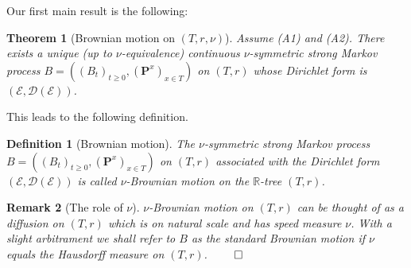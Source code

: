 \documentclass[11pt]{amsart}
\numberwithin{equation}{section}
\newtheorem{definition}{Definition}[section]
\newtheorem{theorem}{Theorem}
\newtheorem{remark}[definition]{Remark}
\begin{document}
Our first main result is the following:

\begin{theorem}[Brownian motion on $(T,r,\nu)$]
Assume (A1) and (A2). There exists a {unique (up to $\nu$-equivalence)}
continuous $\nu$-symmetric strong Markov process
$B=((B_t)_{t\ge 0},({\mathbf P}^x)_{x\in T})$ on $(T,r)$
whose Dirichlet form is
$({\mathcal E}, {\mathcal D}({\mathcal E}))$.
\label{T:01}\end{theorem}{\smallskip}

This leads to the following definition.
\begin{definition}[Brownian motion] The $\nu$-symmetric strong Markov process
$B=((B_t)_{t\ge 0},({\mathbf P}^x)_{x\in T})$ on $(T,r)$
associated with the Dirichlet form $({\mathcal E}, {\mathcal D}({\mathcal E}))$ is called $\nu$-Brownian motion on the ${{\mathbb R}}$-tree $(T,r)$.
\label{Def:05}
\end{definition}{\smallskip}

{
\begin{remark}[The role of $\nu$]{\it} $\nu$-Brownian motion on $(T,r)$ can be thought of as a diffusion on $(T,r)$ which is on {{\it} natural scale} and has
{{\it} speed measure} $\nu$. With a slight arbitrament we shall refer to $B$ as the {{\it} standard Brownian motion} if $\nu$ equals the Hausdorff measure on $(T,r)$.
\label{Rem:07}
\hfill$\qed$
\end{remark}{\smallskip}
}
\end{document}
